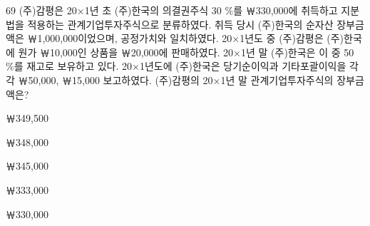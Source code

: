 \begin{question}{69}
(주)감평은 20×1년 초 (주)한국의 의결권주식 30 \%를 ￦330,000에 취득하고 지분법을 적용하는 관계기업투자주식으로 분류하였다. 취득 당시 (주)한국의 순자산 장부금액은 ￦1,000,000이었으며, 공정가치와 일치하였다. 20×1년도 중 (주)감평은
(주)한국에 원가 ￦10,000인 상품을 ￦20,000에 판매하였다. 20×1년 말 (주)한국은 이 중 50 \%를 재고로 보유하고 있다. 20×1년도에 (주)한국은 당기순이익과 기타포괄이익을 각각 ￦50,000, ￦15,000 보고하였다. (주)감평의 20×1년 말 관계기업투자주식의 장부금액은? \par
\begin{choices}
  \item ￦349,500
  \item ￦348,000
  \item ￦345,000
  \item ￦333,000
  \item ￦330,000
\end{choices}
\end{question}
